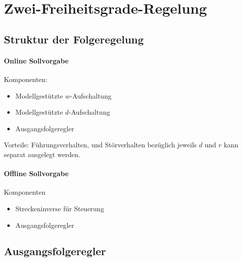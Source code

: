 \chapter{Zwei-Freiheitsgrade-Regelung}
\section{Struktur der Folgeregelung}
\subsubsection{Online Sollvorgabe}
Komponenten:
\begin{itemize}
    \item Modellgestützte $w$-Aufschaltung
    \item Modellgestützte $d$-Aufschaltung
    \item Ausgangsfolgeregler
\end{itemize}

Vorteile: Führungsverhalten, und Störverhalten bezüglich jeweils $d$ und $r$ kann
separat ausgelegt werden.

\subsubsection{Offline Sollvorgabe}
Komponenten
\begin{itemize}
    \item Streckeninverse für Steuerung
    \item Ausgangsfolgeregler
\end{itemize}

\section{Ausgangsfolgeregler}
